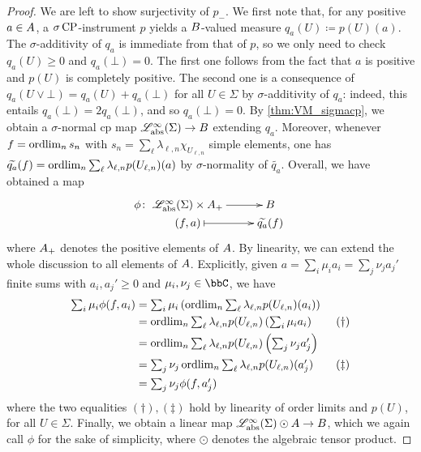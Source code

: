 \begin{proof}
	We are left to show surjectivity of $p_{-}$.
	We first note that, for any positive $a\in {A}$, a $\sigma\operatorname{CP}$-instrument $p$ yields a ${B}$-valued measure $q_a(U)\coloneqq p(U)(a)$.
	The $\sigma$-additivity of $q_a$ is immediate from that of $p$, so we only need to check $q_a(U)\ge 0$ and $q_a(\bot)=0$.
	The first one follows from the fact that $a$ is positive and $p(U)$ is completely positive.
	The second one is a consequence of $q_a(U\vee \bot)=q_a(U)+q_a(\bot)$ for all $U\in \Sigma$ by $\sigma$-additivity of $q_a$: indeed, this entails $q_a(\bot)=2q_a(\bot)$, and so $q_a(\bot)=0$.
	By \cref{thm:VM_sigmacp}, we obtain a $\sigma$-normal cp map $\mathscr{L}_{\operatorname{abs}}^{\infty}(\Sigma)\to {B}$ extending $q_a$.
	Moreover, whenever $f=\operatorname{ordlim}_n s_n$ with $s_n=\sum_\ell \lambda_{\ell,n} \chi_{U_{\ell,n}}$ simple elements, one has $\widetilde{q_a} (f)= \operatorname{ordlim}_n \sum_\ell \lambda_{\ell,n} p({U_{\ell,n}})(a)$ by $\sigma$-normality of $\widetilde{q_a}$.
	Overall, we have obtained a map
	\[
		\phi \colon   \xymatrix@R=.1pt{
		\Linfbool(\Sigma)\times \A_+ \ar[r]& \B \\
		(f,a)\ar@{|->}[r]
		& \widetilde{q_a}(f)
		}
	\]
	where ${A}_+$ denotes the positive elements of ${A}$.
	By linearity, we can extend the whole discussion to all elements of ${A}$.
	Explicitly, given $a=\sum_i \mu_i a_i = \sum_j \nu_j a_j'$ finite sums with $a_i,a_j'\ge 0$ and $\mu_i,\nu_j \in \bbC$, we have
	\begin{align*}
		\textstyle\sum_i\mu_i \phi(f,a_i) & =\textstyle \sum_i \mu_i \left(\operatorname{ordlim}_n \sum_{\ell} \lambda_{\ell,n} p(U_{\ell,n})(a_i)\right)          \\
		                                 & =\textstyle \operatorname{ordlim}_n \sum_{\ell} \lambda_{\ell,n}p(U_{\ell,n}) \left(\sum_i \mu_i a_i\right) \tag{\dag} \\
		                                 & =\textstyle\operatorname{ordlim}_n \sum_{\ell} \lambda_{\ell,n}p(U_{\ell,n}) \left(\sum_j \nu_j a_j'\right)            \\
		                                 & =\textstyle \sum_j \nu_j \operatorname{ordlim}_n  \sum_{\ell} \lambda_{\ell,n} p(U_{\ell,n})(a_j') \tag{\ddag}          \\
		                                 & =\textstyle\sum_j \nu_j \phi(f,a_j')
	\end{align*}
	where the two equalities $(\dag),(\ddag)$ hold by linearity of order limits and $p(U)$, for all $U \in \Sigma$.
	Finally, we obtain a linear map $\mathscr{L}_{\operatorname{abs}}^{\infty}(\Sigma)\odot {A} \to {B} $, which we again call $\phi$ for the sake of simplicity, where $\odot$ denotes the algebraic tensor product.


\end{proof}
